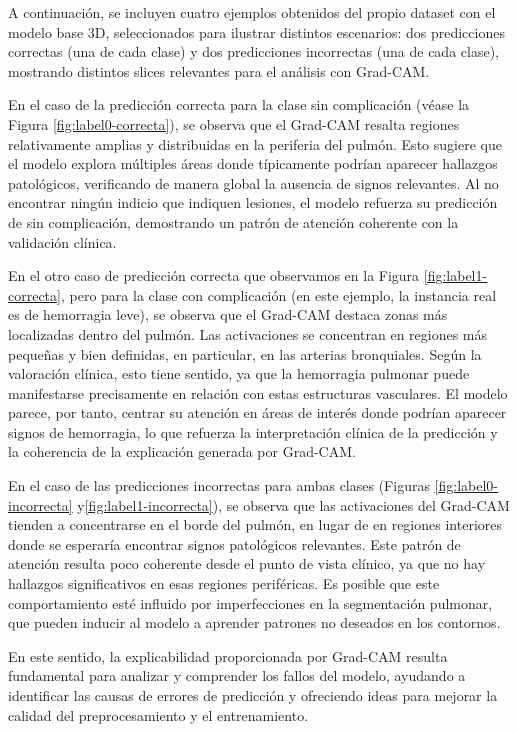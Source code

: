 A continuación, se incluyen cuatro ejemplos obtenidos del propio dataset con el modelo base 3D, seleccionados para ilustrar distintos escenarios: dos predicciones correctas (una de cada clase) y dos predicciones incorrectas (una de cada clase), mostrando distintos slices relevantes para el análisis con Grad-CAM.

En el caso de la predicción correcta para la clase sin complicación (véase la Figura \ref{fig:label0-correcta}), se observa que el Grad-CAM resalta regiones relativamente amplias y distribuidas en la periferia del pulmón. Esto sugiere que el modelo explora múltiples áreas donde típicamente podrían aparecer hallazgos patológicos, verificando de manera global la ausencia de signos relevantes. Al no encontrar ningún indicio que indiquen lesiones, el modelo refuerza su predicción de sin complicación, demostrando un patrón de atención coherente con la validación clínica.

En el otro caso de predicción correcta que observamos en la Figura \ref{fig:label1-correcta}, pero para la clase con complicación (en este ejemplo, la instancia real es de hemorragia leve), se observa que el Grad-CAM destaca zonas más localizadas dentro del pulmón. Las activaciones se concentran en regiones más pequeñas y bien definidas, en particular, en las arterias bronquiales. Según la valoración clínica, esto tiene sentido, ya que la hemorragia pulmonar puede manifestarse precisamente en relación con estas estructuras vasculares. El modelo parece, por tanto, centrar su atención en áreas de interés donde podrían aparecer signos de hemorragia, lo que refuerza la interpretación clínica de la predicción y la coherencia de la explicación generada por Grad-CAM.

En el caso de las predicciones incorrectas para ambas clases (Figuras \ref{fig:label0-incorrecta} y\ref{fig:label1-incorrecta}), se observa que las activaciones del Grad-CAM tienden a concentrarse en el borde del pulmón, en lugar de en regiones interiores donde se esperaría encontrar signos patológicos relevantes. Este patrón de atención resulta poco coherente desde el punto de vista clínico, ya que no hay hallazgos significativos en esas regiones periféricas. Es posible que este comportamiento esté influido por imperfecciones en la segmentación pulmonar, que pueden inducir al modelo a aprender patrones no deseados en los contornos. 

En este sentido, la explicabilidad proporcionada por Grad-CAM resulta fundamental para analizar y comprender los fallos del modelo, ayudando a identificar las causas de errores de predicción y ofreciendo ideas para mejorar la calidad del preprocesamiento y el entrenamiento.

